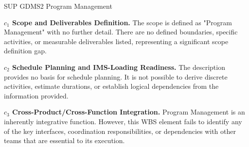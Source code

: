 %
\begin{frame}{SUP GDMS2 Program Management}
\begin{minipage}{0.90\textwidth}
\raggedright
\fontsize{8}{9.5}\selectfont
\textbf{\(c_1\) Scope and Deliverables Definition.}
The scope is defined as "Program Management" with no further detail. There are no defined boundaries, specific activities, or measurable deliverables listed, representing a significant scope definition gap.\par\vspace{0.6em}
\textbf{\(c_2\) Schedule Planning and IMS-Loading Readiness.}
The description provides no basis for schedule planning. It is not possible to derive discrete activities, estimate durations, or establish logical dependencies from the information provided.\par\vspace{0.6em}
\textbf{\(c_3\) Cross-Product/Cross-Function Integration.}
Program Management is an inherently integrative function. However, this WBS element fails to identify any of the key interfaces, coordination responsibilities, or dependencies with other teams that are essential to its execution.\par\vspace{0.6em}
\end{minipage}
\end{frame}

\endinput

